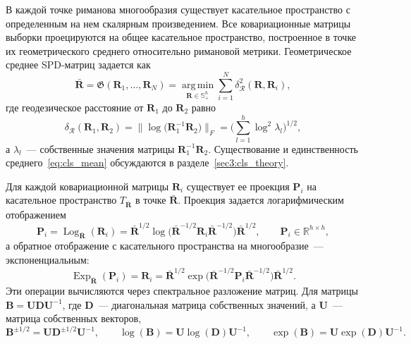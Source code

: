 В каждой точке риманова многообразия существует касательное пространство с определенным на нем скалярным произведением. Все ковариационные матрицы выборки проецируются на общее касательное пространство, построенное в точке их геометрического среднего относительно римановой метрики. Геометрическое среднее SPD-матриц задается как
\begin{equation}\label{eq:cls_mean}
\bar{\mathbf{R}} = \mathfrak{G}\left(\mathbf{R}_1, \ldots, \mathbf{R}_N\right) = \operatorname*{arg\,min}_{\mathbf{R} \in \mathbb{S}_{+}^{h}} \sum_{i=1}^{N} \delta_{\mathcal{R}}^2(\mathbf{R}, \mathbf{R}_i),
\end{equation}
где геодезическое расстояние от $\mathbf{R}_1$ до $\mathbf{R}_2$ равно
\begin{equation}\label{eq:cls_dist}
\delta_{\mathcal{R}}(\mathbf{R}_1, \mathbf{R}_2) = \big\| \log\big(\mathbf{R}_1^{-1}\mathbf{R}_2\big) \big\|_F = \Big( \sum_{l=1}^{h} \log^2 \lambda_l \Big)^{1/2},
\end{equation}
а $\lambda_l$~--- собственные значения матрицы $\mathbf{R}_1^{-1}\mathbf{R}_2$. Существование и единственность среднего~\eqref{eq:cls_mean} обсуждаются в разделе~\ref{sec3:cls_theory}.

Для каждой ковариационной матрицы $\mathbf{R}_i$ существует ее проекция $\mathbf{P}_i$ на касательное пространство $T_{\bar{\mathbf{R}}}$ в точке $\bar{\mathbf{R}}$. Проекция задается логарифмическим отображением
\begin{equation}\label{eq:cls_log}
\mathbf{P}_i = \operatorname{Log}_{\bar{\mathbf{R}}}(\mathbf{R}_i) = \bar{\mathbf{R}}^{1/2} \log\!\big( \bar{\mathbf{R}}^{-1/2} \mathbf{R}_i \bar{\mathbf{R}}^{-1/2} \big) \bar{\mathbf{R}}^{1/2}, \qquad \mathbf{P}_i \in \mathbb{R}^{h \times h},
\end{equation}
а обратное отображение с касательного пространства на многообразие~--- экспоненциальным:
\begin{equation*}\operatorname{Exp}_{\bar{\mathbf{R}}}(\mathbf{P}_i) = \mathbf{R}_i = \bar{\mathbf{R}}^{1/2} \exp\!\big( \bar{\mathbf{R}}^{-1/2} \mathbf{P}_i \bar{\mathbf{R}}^{-1/2} \big) \bar{\mathbf{R}}^{1/2}.
\end{equation*}
Эти операции вычисляются через спектральное разложение матриц. Для матрицы $\mathbf{B} = \mathbf{U} \mathbf{D} \mathbf{U}^{-1}$, где $\mathbf{D}$~--- диагональная матрица собственных значений, а $\mathbf{U}$~--- матрица собственных векторов,
\begin{equation}\label{eq:cls_matfun}
\mathbf{B}^{\pm 1/2} = \mathbf{U} \mathbf{D}^{\pm 1/2} \mathbf{U}^{-1}, \qquad \log(\mathbf{B}) = \mathbf{U} \log(\mathbf{D}) \mathbf{U}^{-1}, \qquad \exp(\mathbf{B}) = \mathbf{U} \exp(\mathbf{D}) \mathbf{U}^{-1}.
\end{equation}

